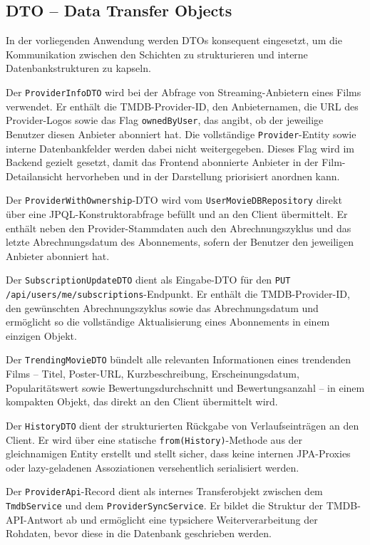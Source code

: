 \subsection{DTO -- Data Transfer Objects}

In der vorliegenden Anwendung werden DTOs konsequent eingesetzt, um die
Kommunikation zwischen den Schichten zu strukturieren und interne
Datenbankstrukturen zu kapseln.

Der \texttt{ProviderInfoDTO} wird bei der Abfrage von Streaming-Anbietern
eines Films verwendet. Er enthält die TMDB-Provider-ID, den Anbieternamen,
die URL des Provider-Logos sowie das Flag \texttt{ownedByUser}, das angibt,
ob der jeweilige Benutzer diesen Anbieter abonniert hat. Die vollständige
\texttt{Provider}-Entity sowie interne Datenbankfelder werden dabei nicht
weitergegeben.
Dieses Flag wird im Backend gezielt gesetzt, damit das Frontend abonnierte
Anbieter in der Film-Detailansicht hervorheben und in der Darstellung
priorisiert anordnen kann.

Der \texttt{ProviderWithOwnership}-DTO wird vom \texttt{UserMovieDBRepository}
direkt über eine JPQL-Konstruktorabfrage befüllt und an den Client
übermittelt. Er enthält neben den Provider-Stammdaten auch den
Abrechnungszyklus und das letzte Abrechnungsdatum des Abonnements, sofern
der Benutzer den jeweiligen Anbieter abonniert hat.

Der \texttt{SubscriptionUpdateDTO} dient als Eingabe-DTO für den
\texttt{PUT /api/users/me/subscriptions}-Endpunkt. Er enthält die
TMDB-Provider-ID, den gewünschten Abrechnungszyklus sowie das
Abrechnungsdatum und ermöglicht so die vollständige Aktualisierung eines
Abonnements in einem einzigen Objekt.

Der \texttt{TrendingMovieDTO} bündelt alle relevanten Informationen eines
trendenden Films -- Titel, Poster-URL, Kurzbeschreibung, Erscheinungsdatum,
Popularitätswert sowie Bewertungsdurchschnitt und Bewertungsanzahl -- in
einem kompakten Objekt, das direkt an den Client übermittelt wird.

Der \texttt{HistoryDTO} dient der strukturierten Rückgabe von
Verlaufseinträgen an den Client. Er wird über eine statische
\texttt{from(History)}-Methode aus der gleichnamigen Entity erstellt und
stellt sicher, dass keine internen JPA-Proxies oder lazy-geladenen
Assoziationen versehentlich serialisiert werden.

Der \texttt{ProviderApi}-Record dient als internes Transferobjekt zwischen
dem \texttt{TmdbService} und dem \texttt{ProviderSyncService}. Er bildet
die Struktur der TMDB-API-Antwort ab und ermöglicht eine typsichere
Weiterverarbeitung der Rohdaten, bevor diese in die Datenbank geschrieben
werden.

